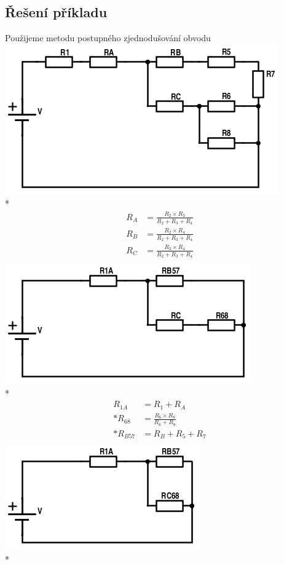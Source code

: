 \documentclass[a4paper, 10pt, fleqn]{article}
\begin{document}
\subsection*{Řešení příkladu}
 Použijeme metodu postupného zjednodušování obvodu \\
\includegraphics[scale=0.8]{IEL_OBR/1b.png} \\*
\begin{align*}
 R_{A} &= \frac{R_{2} \times R_{3}}{R_{2} + R_{3} + R_{4}} \\
 R_{B} &= \frac{R_{2} \times R_{4}}{R_{2} + R_{3} + R_{4}} \\
 R_{C} &= \frac{R_{3} \times R_{4}}{R_{2} + R_{3} + R_{4}} \\
\end{align*}
\includegraphics[scale=0.8]{IEL_OBR/1c.png}\\*
\begin{align*}
 R_{1A} &= R_{1} + R_{A} \\*
 R_{68} &= \frac{R_{6} \times R_{8}}{R_{6} + R_{8}} \\*
 R_{B57} &= R_{B} + R_{5} + R_{7} \\
\end{align*}
\includegraphics[scale=1]{IEL_OBR/1d.png}\\*
\end{document}
